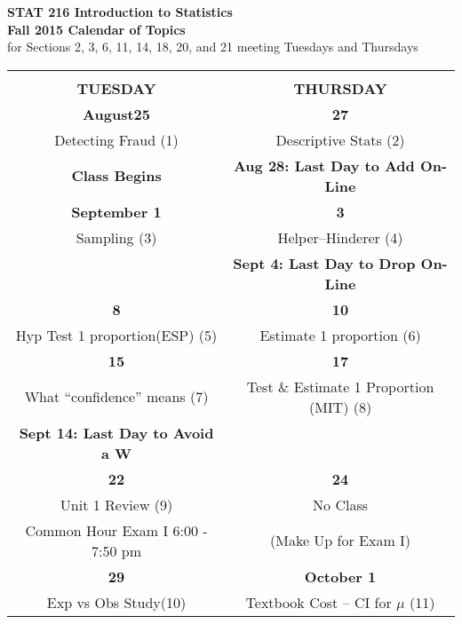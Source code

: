 \begin{center} %
\vspace{-.5in}
{\LARGE \bf STAT 216 \hspace{.05in} Introduction to Statistics}
\\
{\Large \bf Fall 2015 Calendar of Topics}\\
for Sections 2, 3, 6,  11, 14, 18, 20, and 21  meeting Tuesdays and
Thursdays
\vspace{.1in}\\
\begin{tabular}{|c|c|} \hline
 & \\
  \bf{TUESDAY} & \bf{THURSDAY} \\
 \hline \hline
   \bf{August}\hfill\bf{25} & \hfill\bf{27} \\
Detecting Fraud \small{(1)} &   Descriptive Stats \small{(2)} \\
 \small\bf{Class Begins} &   
  \small\bf{Aug 28: Last Day to Add On-Line} 
\\\hline
  \bf{September} \hfill\bf{1} & \hfill\bf{3} \\
   Sampling  \small{(3)} &  Helper--Hinderer \small{(4)} \\
     \hspace{2in}& \small\bf{Sept 4: Last Day to Drop On-Line} \\ \hline
  \hfill\bf{8} & \hfill\bf{10} \\
  Hyp Test 1 proportion(ESP) \small{(5)} &  
 Estimate 1 proportion \small{(6)}  \\
  \hline

 \hfill\bf{15} & \hfill\bf{17} \\
 What ``confidence'' means  \small{(7)}& 
 Test \& Estimate 1 Proportion (MIT) \small{(8)}\\
  \small\bf{Sept 14: Last Day to Avoid a W} &   \\
   \hline

  \hfill\bf{22} & \hfill\bf{24} \\
 Unit 1 Review  \small{(9)} & No Class \\
Common Hour Exam I 6:00 - 7:50 pm & (Make Up for Exam I)\\
    \hline

  \hfill\bf{29}&   \bf{October} \hfill\bf{1} \\
  Exp vs Obs Study\small{(10)} & Textbook Cost -- CI for $\mu$  \small{(11)} \\ \hline


\end{tabular}
\end{center}
